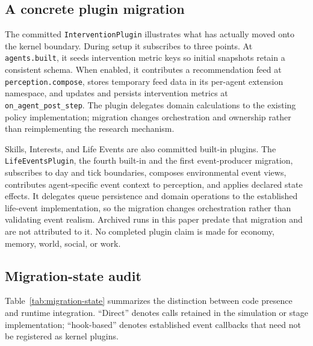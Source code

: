 \subsection{A concrete plugin migration}

The committed \texttt{InterventionPlugin} illustrates what has actually moved
onto the kernel boundary.  During setup it subscribes to three points.  At
\texttt{agents.built}, it seeds intervention metric keys so initial snapshots
retain a consistent schema.  When enabled, it contributes a recommendation
feed at \texttt{perception.compose}, stores temporary feed data in its
per-agent extension namespace, and updates and persists intervention metrics
at \texttt{on\_agent\_post\_step}.  The plugin delegates domain calculations
to the existing policy implementation; migration changes orchestration and
ownership rather than reimplementing the research mechanism.

Skills, Interests, and Life Events are also committed built-in plugins.  The
\texttt{LifeEventsPlugin}, the fourth built-in and the first event-producer
migration, subscribes to day and tick boundaries, composes environmental event
views, contributes agent-specific event context to perception, and applies
declared state effects.  It delegates queue persistence and domain operations
to the established life-event implementation, so the migration changes
orchestration rather than validating event realism.  Archived runs in this
paper predate that migration and are not attributed to it.  No completed plugin
claim is made for economy, memory, world, social, or work.

\subsection{Migration-state audit}

Table~\ref{tab:migration-state} summarizes the distinction between code
presence and runtime integration.  ``Direct'' denotes calls retained in the
simulation or stage implementation; ``hook-based'' denotes established event
callbacks that need not be registered as kernel plugins.


